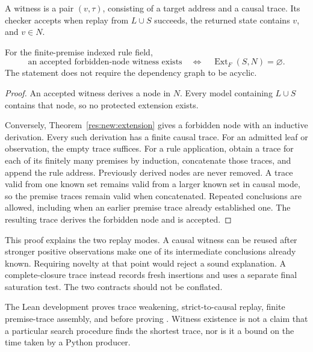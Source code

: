 \begin{definition}
\label{res:trace:witness}
A witness is a pair $(v,\tau)$, consisting of a target address and a causal trace. Its checker accepts when replay from $L\cup S$ succeeds, the returned state contains $v$, and $v\in N$.
\end{definition}

\begin{theorem}
\label{res:trace:complete}
For the finite-premise indexed rule field,
\[
 \boxed{
 \text{an accepted forbidden-node witness exists}
 \quad\Longleftrightarrow\quad
 \operatorname{Ext}_F(S,N)=\varnothing.
 }
\]
The statement does not require the dependency graph to be acyclic.
\end{theorem}
\begin{proof}
An accepted witness derives a node in $N$. Every model containing $L\cup S$ contains that node, so no protected extension exists.

Conversely, Theorem~\ref{res:new:extension} gives a forbidden node with an inductive derivation. Every such derivation has a finite causal trace. For an admitted leaf or observation, the empty trace suffices. For a rule application, obtain a trace for each of its finitely many premises by induction, concatenate those traces, and append the rule address. Previously derived nodes are never removed. A trace valid from one known set remains valid from a larger known set in causal mode, so the premise traces remain valid when concatenated. Repeated conclusions are allowed, including when an earlier premise trace already established one. The resulting trace derives the forbidden node and is accepted.
\end{proof}

This proof explains the two replay modes. A causal witness can be reused after stronger positive observations make one of its intermediate conclusions already known. Requiring novelty at that point would reject a sound explanation. A complete-closure trace instead records fresh insertions and uses a separate final saturation test. The two contracts should not be conflated.

The Lean development proves trace weakening, strict-to-causal replay, finite premise-trace assembly, and  before proving . Witness existence is not a claim that a particular search procedure finds the shortest trace, nor is it a bound on the time taken by a Python producer.

